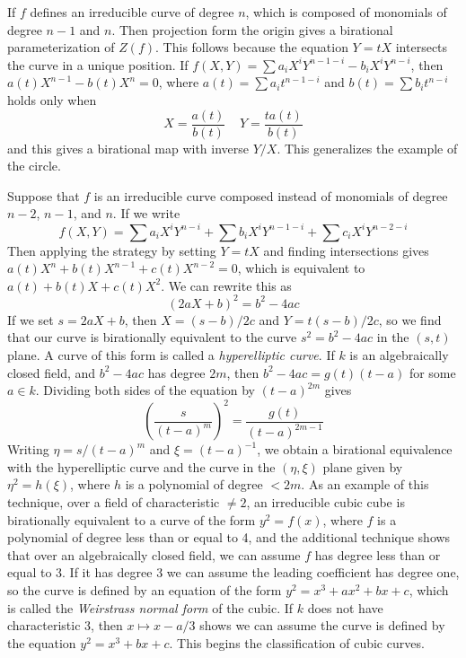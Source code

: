 \begin{example}
    If $f$ defines an irreducible curve of degree $n$, which is composed of monomials of degree $n-1$ and $n$. Then projection form the origin gives a birational parameterization of $Z(f)$. This follows because the equation $Y = tX$ intersects the curve in a unique position. If $f(X,Y) = \sum a_i X^iY^{n-1-i} - b_i X^iY^{n-i}$, then $a(t) X^{n-1} - b(t) X^n = 0$, where $a(t) = \sum a_i t^{n-1-i}$ and $b(t) = \sum b_i t^{n-i}$ holds only when
    \[  X = \frac{a(t)}{b(t)}\ \ \ \ \ Y = \frac{ta(t)}{b(t)} \]
    and this gives a birational map with inverse $Y/X$. This generalizes the example of the circle.
\end{example}

\begin{example}
    Suppose that $f$ is an irreducible curve composed instead of monomials of degree $n-2$, $n-1$, and $n$. If we write
    \[ f(X,Y) = \sum a_i X^iY^{n-i} + \sum b_i X^iY^{n-1-i} + \sum c_i X^iY^{n-2-i}  \]
    Then applying the strategy by setting $Y = tX$ and finding intersections gives $a(t) X^n + b(t) X^{n-1} + c(t) X^{n-2} = 0$, which is equivalent to $a(t) + b(t)X + c(t)X^2$. We can rewrite this as
    \[ \left( 2aX + b \right)^2 = b^2 - 4ac \]
    If we set $s = 2aX + b$, then $X = (s-b)/2c$ and $Y = t(s-b)/2c$, so we find that our curve is birationally equivalent to the curve $s^2 = b^2 - 4ac$ in the $(s,t)$ plane. A curve of this form is called a \emph{hyperelliptic curve}. If $k$ is an algebraically closed field, and $b^2 - 4ac$ has degree $2m$, then $b^2 - 4ac = g(t)(t - a)$ for some $a \in k$. Dividing both sides of the equation by $(t-a)^{2m}$ gives
    \[ \left( \frac{s}{(t-a)^m} \right)^2 = \frac{g(t)}{(t-a)^{2m-1}} \]
    Writing $\eta = s/(t-a)^m$ and $\xi = (t-a)^{-1}$, we obtain a birational equivalence with the hyperelliptic curve and the curve in the $(\eta, \xi)$ plane given by $\eta^2 = h(\xi)$, where $h$ is a polynomial of degree $< 2m$. As an example of this technique, over a field of characteristic $\neq 2$, an irreducible cubic cube is birationally equivalent to a curve of the form $y^2 = f(x)$, where $f$ is a polynomial of degree less than or equal to 4, and the additional technique shows that over an algebraically closed field, we can assume $f$ has degree less than or equal to 3. If it has degree 3 we can assume the leading coefficient has degree one, so the curve is defined by an equation of the form $y^2 = x^3 + ax^2 + bx + c$, which is called the \emph{Weirstrass normal form} of the cubic. If $k$ does not have characteristic 3, then $x \mapsto x - a/3$ shows we can assume the curve is defined by the equation $y^2 = x^3 + bx + c$. This begins the classification of cubic curves.
\end{example}

